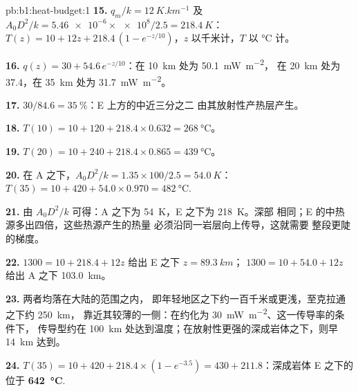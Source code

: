 \begin{solution}{pb:b1:heat-budget:1}
\textbf{15.} $q_m/k = \qty{12}{K.km^{-1}}$ 及 $A_0D^2/k = \num{5.46e-6}\times\num{e8}/2.5
= \qty{218.4}{K}$：$T(z) = 10 + 12z + 218.4\,(1 - e^{-z/10})$，$z$ 以千米计，$T$ 以
\unit{\degreeCelsius} 计。

\textbf{16.} $q(z) = 30 + 54.6\,e^{-z/10}$：在 \qty{10}{km} 处为 \qty{50.1}{mW.m^{-2}}，
在 \qty{20}{km} 处为 \num{37.4}，在 \qty{35}{km} 处为 \qty{31.7}{mW.m^{-2}}。

\textbf{17.} $30/84.6 = \qty{35}{\percent}$：E 上方的中近三分之二
由其放射性产热层产生。

\textbf{18.} $T(10) = 10 + 120 + 218.4\times0.632 = \qty{268}{\degreeCelsius}$。

\textbf{19.} $T(20) = 10 + 240 + 218.4\times0.865 = \qty{439}{\degreeCelsius}$。

\textbf{20.} 在 A 之下，$A_0D^2/k = 1.35\times100/2.5 = \qty{54.0}{K}$：
$T(35) = 10 + 420 + 54.0\times0.970 = \qty{482}{\degreeCelsius}$.

\textbf{21.} 由 $A_0D^2/k$ 可得：A 之下为 \qty{54}{K}，E 之下为 \qty{218}{K}。深部
相同；E 的中热源多出四倍，这些热源产生的热量
必须沿同一岩层向上传导，这就需要
整段更陡的梯度。

\textbf{22.} $1300 = 10 + 218.4 + 12z$ 给出 E 之下 $z = \qty{89.3}{km}$；
$1300 = 10 + 54.0 + 12z$ 给出 A 之下 \qty{103.0}{km}。

\textbf{23.} 两者均落在大陆的范围之内，
即年轻地区之下约一百千米或更浅，至克拉通之下约 \qty{250}{km}，
靠近其较薄的一侧：在约化为 \qty{30}{mW.m^{-2}}、这一传导率的条件下，
传导型约在
\qty{100}{km} 处达到温度；在放射性更强的深成岩体之下，则早 \qty{14}{km} 达到。

\textbf{24.} $T(35) = 10 + 420 + 218.4\times(1 - e^{-3.5}) = 430 + 211.8$：深成岩体 E
之下的位于
\textbf{\qty[text-series-to-math=true]{642}{\degreeCelsius}}.
\end{solution}
